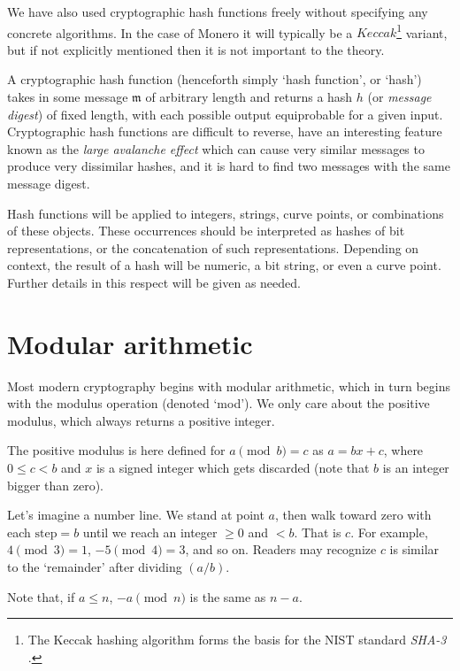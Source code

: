 We have also used cryptographic hash functions freely without specifying any concrete algorithms. In the case of Monero it will typically be a \(\mathit{Keccak}\)\footnote{\label{kekkak_note}The Keccak hashing algorithm forms the basis for the NIST standard {\em SHA-3} \cite{nist-sha3}.} variant, but if not explicitly mentioned then it is not important to the theory. 

A cryptographic hash function (henceforth simply `hash function', or `hash') takes in some message $\mathfrak{m}$ of arbitrary length and returns a hash $h$ (or {\em message digest}) of fixed length, with each possible output equiprobable for a given input. Cryptographic hash functions are difficult to reverse, have an interesting feature known as the {\em large avalanche effect} which can cause very similar messages to produce very dissimilar hashes, and it is hard to find two messages with the same message digest.

Hash functions will be applied to integers, strings, curve points, or combinations of these objects. These occurrences should be interpreted as hashes of bit representations, or the concatenation of such representations. Depending on context, the result of a hash will be numeric, a bit string, or even a curve point. Further details in this respect will be given as needed.



\section{Modular arithmetic}

Most modern cryptography begins with modular arithmetic, which in turn begins with the modulus operation (denoted `mod'). We only care about the positive modulus, which always returns a positive integer.

The positive modulus is here defined for $a \pmod b = c$ as $a=bx+c$, where $0\leq{c}<{b}$ and $x$ is a signed integer which gets discarded (note that $b$ is an integer bigger than zero).

Let's imagine a number line. We stand at point $a$, then walk toward zero with each $\text{step} =b$ until we reach an integer $\geq{0}$ and $<b$. That is $c$. For example, $4 \pmod 3 = 1$, $-5 \pmod 4 = 3$, and so on. Readers may recognize $c$ is similar to the `remainder' after dividing $(a/b)$.

Note that, if $a \leq n$, $-a \pmod n$ is the same as $n - a$.

